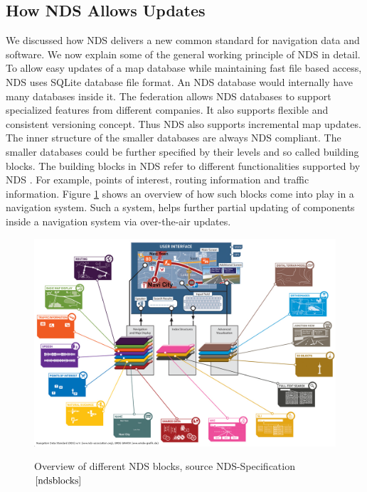 \subsection{How NDS Allows Updates}
We discussed how NDS delivers a new common standard for navigation data and software. We now explain some of the general working principle of NDS in detail. To allow easy updates of a map database while maintaining fast file based access, NDS uses SQLite database file format. An NDS database would internally have many databases inside it. The federation allows NDS databases to support specialized features from different companies. It also supports flexible and consistent versioning concept. Thus NDS also supports incremental map updates. The inner structure of the smaller databases are always NDS compliant. The smaller databases could be further specified by their levels and so called building blocks. The building blocks in NDS refer to different functionalities supported by NDS \cite{ndsblocks}. For example, points of interest, routing information and traffic information. Figure \ref{fig:ndsblocks} shows an overview of how such blocks come into play in a navigation system. Such a system, helps further partial updating of components inside a navigation system via over-the-air updates.  \\
\begin{figure}
\includegraphics[scale=.42, angle=90]{ndsblocks.png}
\label{fig:ndsblocks}
\caption{Overview of different NDS blocks, source NDS-Specification$\cite{ndsblocks}$}
\end{figure}


